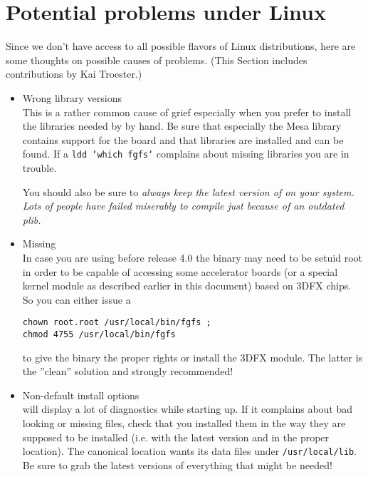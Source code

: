 \section{Potential problems under Linux}
Since we don't have access to all possible flavors of Linux distributions, here are some
thoughts on possible causes of problems. (This Section includes contributions by Kai
Troester.)

\begin{itemize}

\item{Wrong library versions}\\
  This is a rather common cause of grief especially when you prefer to
  install the libraries needed by \FlightGear{} by hand. Be sure that
  especially the Mesa library contains support for the
   board and that  libraries are installed and can be
  found. If a \texttt{ldd `which fgfs`} complains about missing
  libraries you are in trouble.

  You should also be sure to \em{always} keep the \em{latest} version
  of \PLIB{} on your system. Lots of people have
  failed miserably to compile \FlightGear{} just because of an outdated
  plib.


\item{Missing }\\
 In case you are using  before release 4.0 the \FlightGear{} binary may need to be  setuid root in order to be capable of  accessing some accelerator boards (or a special kernel module as described earlier in this document) based on 3DFX chips.
  So you can either issue a

  \texttt{chown root.root /usr/local/bin/fgfs ;}\\
  \texttt{chmod 4755 /usr/local/bin/fgfs}

  to give the \FlightGear{} binary the proper rights or install
  the 3DFX module. The latter is the ''clean''
  solution and strongly recommended!


\item{Non-default install options}\\
  \FlightGear{} will display a lot of diagnostics while starting up.
  If it complains about bad looking or missing files, check that you
  installed them in the way they are supposed to be installed (i.e. with the latest
  version and in the proper location). The canonical location \FlightGear{}
  wants its data files under \texttt{/usr/local/lib}.
   Be sure to grab the latest versions of everything that might be needed!


\end{itemize}
